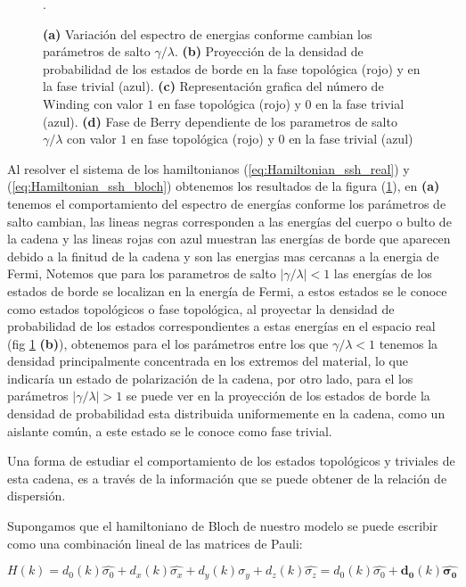 \begin{figure}[h!]
\begin{subfigure}[b!]{0.27 \textwidth}
     \end{subfigure}
        \caption{\textbf{(a)} Variación del espectro de energias conforme cambian los parámetros de salto $\gamma/\lambda$. \textbf{(b)} Proyección de la densidad de probabilidad de los estados de borde en la fase topológica (rojo) y en la fase trivial (azul). \textbf{(c)} Representación grafica del número de Winding con valor $1$ en fase topológica (rojo) y $0$ en la fase trivial (azul). \textbf{(d)} Fase de Berry dependiente de los parametros de salto $\gamma/\lambda$ con valor $1$ en fase topológica (rojo) y $0$ en la fase trivial (azul)}.
        \label{fig:SSH_Img_Results}
\end{figure}

Al resolver el sistema de los hamiltonianos (\ref{eq:Hamiltonian_ssh_real}) y (\ref{eq:Hamiltonian_ssh_bloch}) obtenemos los resultados de la figura (\ref{fig:SSH_Img_Results}), en \textbf{(a)} tenemos el comportamiento del espectro de energías conforme los parámetros de salto cambian, las lineas negras corresponden a las energías del cuerpo o bulto de la cadena y las lineas rojas con azul muestran las energías de borde que aparecen debido a la finitud de la cadena y son las energias mas cercanas a la energia de Fermi, Notemos que para los parametros de salto $|\gamma/\lambda|<1$ las energías de los estados de borde se localizan en la energía de Fermi, a estos estados se le conoce como estados topológicos o fase topológica, al proyectar la densidad de probabilidad de los estados correspondientes a estas energías en el espacio real (fig \ref{fig:SSH_Img_Results} \textbf{(b)}), obtenemos para el los parámetros entre los que $\gamma/\lambda < 1$ tenemos la densidad principalmente concentrada en los extremos del material, lo que indicaría un estado de polarización de la cadena, por otro lado, para el los parámetros $|\gamma/\lambda| > 1$ se puede ver en la proyección de los estados de borde la densidad de probabilidad esta distribuida uniformemente en la cadena, como un aislante común, a este estado se le conoce como fase trivial.

Una forma de estudiar el comportamiento de los estados topológicos y triviales de esta cadena, es a través de la información que se puede obtener de la relación de dispersión. 

Supongamos que el hamiltoniano de Bloch de nuestro modelo se puede escribir como una combinación lineal de las matrices de Pauli:

\begin{equation}
    H(k) = d_0(k) \hat{\sigma_0} + d_x(k) \hat{\sigma_x} + d_y(k) \hat{\sigma_y} + d_z(k) \hat{\sigma_z} = d_0(k) \hat{\sigma_0} + \mathbf{d_0}(k) \mathbf{\hat{\sigma_0}}
\end{equation}

